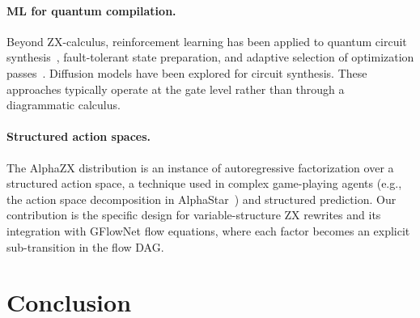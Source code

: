 \documentclass[11pt,a4paper]{article}
\begin{document}
\paragraph{ML for quantum compilation.}
Beyond ZX-calculus, reinforcement learning has been applied to quantum
circuit synthesis~\cite{fosel2021quantum}, fault-tolerant state
preparation, and adaptive selection of optimization
passes~\cite{mills2025adaptive}.  Diffusion models have been explored for
circuit synthesis.  These approaches typically operate at the gate level
rather than through a diagrammatic calculus.

\paragraph{Structured action spaces.}
The AlphaZX distribution is an instance of autoregressive factorization
over a structured action space, a technique used in complex game-playing
agents (e.g., the action space decomposition in
AlphaStar~\cite{vinyals2019grandmaster}) and structured prediction.  Our
contribution is the specific design for variable-structure ZX rewrites
and its integration with GFlowNet flow equations, where each factor
becomes an explicit sub-transition in the flow DAG.


\section{Conclusion}\label{sec:conclusion}





\end{document}
